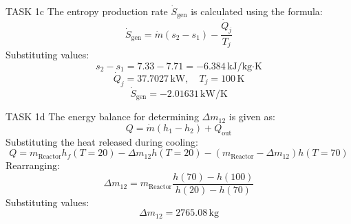 TASK 1c  
The entropy production rate \( \dot{S}_{\text{gen}} \) is calculated using the formula:  
\[
\dot{S}_{\text{gen}} = \dot{m} (s_2 - s_1) - \frac{\dot{Q}_j}{T_j}
\]  
Substituting values:  
\[
s_2 - s_1 = 7.33 - 7.71 = -6.384 \, \text{kJ/kg·K}
\]  
\[
\dot{Q}_j = 37.7027 \, \text{kW}, \quad T_j = 100 \, \text{K}
\]  
\[
\dot{S}_{\text{gen}} = -2.01631 \, \text{kW/K}
\]  

TASK 1d  
The energy balance for determining \( \Delta m_{12} \) is given as:  
\[
Q = \dot{m} (h_1 - h_2) + Q_{\text{out}}
\]  
Substituting the heat released during cooling:  
\[
Q = m_{\text{Reactor}} h_{f}(T=20) - \Delta m_{12} h(T=20) - (m_{\text{Reactor}} - \Delta m_{12}) h(T=70)
\]  
Rearranging:  
\[
\Delta m_{12} = m_{\text{Reactor}} \frac{h(70) - h(100)}{h(20) - h(70)}
\]  
Substituting values:  
\[
\Delta m_{12} = 2765.08 \, \text{kg}
\]